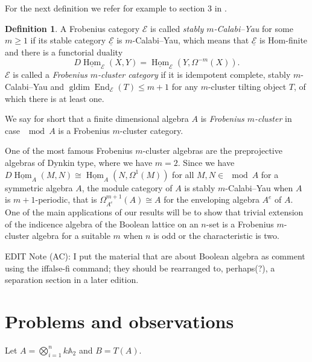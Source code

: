 \documentclass[a4paper,reqno,11pt]{amsart}
\theoremstyle{definition}
\newtheorem{definition}[theorem]{Definition}
\newcommand{\gldim}{\operatorname{gldim}\nolimits}
\newcommand{\Hom}{\operatorname{Hom}\nolimits}
\newcommand{\End}{\operatorname{End}\nolimits}
\newcommand{\new}[1]{{\blue #1}}
\newcommand{\old}[1]{{\red #1}}
\numberwithin{equation}{section}
\begin{document}
\old{For the next definition we refer for example to section 3 in \cite{P}.
\begin{definition}
A Frobenius category $\mathcal{E}$ is called \emph{stably $m$-Calabi--Yau} for some $m \geq 1$ if its stable category $\underline{\mathcal{E}}$ is $m$-Calabi--Yau, which means that $\underline{\mathcal{E}}$ is Hom-finite and there is a functorial duality
$$D \underline{\Hom}_{\mathcal{E}}(X,Y) = \underline{\Hom}_{\mathcal{E}}(Y,\Omega^{-m}(X)).$$
$\mathcal{E}$ is called a \emph{Frobenius $m$-cluster category} if it is idempotent complete, stably $m$-Calabi--Yau and $\gldim \End_{\mathcal{E}}(T) \leq m+1$ for any $m$-cluster tilting object $T$, of which there is at least one. 
\end{definition}

We say for short that a finite dimensional algebra $A$ is \emph{Frobenius $m$-cluster} in case $\mod A$ is a Frobenius $m$-cluster category.}

One of the most famous Frobenius $m$-cluster algebras are the preprojective algebras of Dynkin type, where we have $m=2$.
Since we have $D \underline{\Hom}_A(M,N) \cong \underline{\Hom}_A(N,\Omega^1(M))$ for all $M,N \in \mod A$ for a symmetric algebra $A$, the module category of $A$ is stably $m$-Calabi--Yau when $A$ is $m+1$-periodic, that is $\Omega_{A^e}^{m+1}(A) \cong A$ for the enveloping algebra $A^e$ of $A$.
One of the main applications of our results will be to show that trivial extension of the indicence algebra of the Boolean lattice on an $n$-set is a Frobenius $m$-cluster algebra for a suitable $m$ when $n$ is odd or the characteristic is two.

\new{EDIT Note (AC): I put the material that are about Boolean algebra as comment using the iffalse-fi command; they should be rearranged to, perhaps(?), a separation section in a later edition.}

\iffalse
\section{Problems and observations}
Let $A=\bigotimes_{i=1}^nk\mathbb{A}_2$ and $B=T(A)$.
\end{document}
